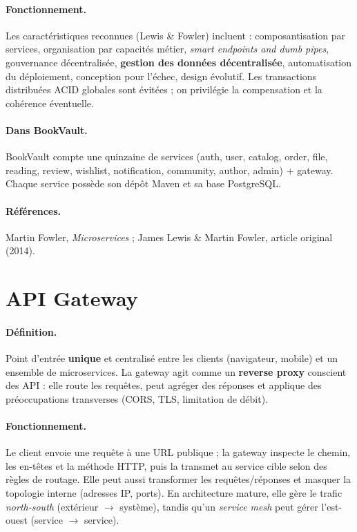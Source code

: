 \documentclass[12pt,a4paper]{report}
\begin{document}
\paragraph{Fonctionnement.} Les caractéristiques reconnues (Lewis \& Fowler) incluent : composantisation par services, organisation par capacités métier, \textit{smart endpoints and dumb pipes}, gouvernance décentralisée, \textbf{gestion des données décentralisée}, automatisation du déploiement, conception pour l'échec, design évolutif. Les transactions distribuées ACID globales sont évitées ; on privilégie la compensation et la cohérence éventuelle.\par

\paragraph{Dans BookVault.} BookVault compte une quinzaine de services (auth, user, catalog, order, file, reading, review, wishlist, notification, community, author, admin) + gateway. Chaque service possède son dépôt Maven et sa base PostgreSQL.\par

\paragraph{Références.} Martin Fowler, \textit{Microservices} ; James Lewis \& Martin Fowler, article original (2014).\par


\section{API Gateway}

\paragraph{Définition.} Point d'entrée \textbf{unique} et centralisé entre les clients (navigateur, mobile) et un ensemble de microservices. La gateway agit comme un \textbf{reverse proxy} conscient des API : elle route les requêtes, peut agréger des réponses et applique des préoccupations transverses (CORS, TLS, limitation de débit).\par

\paragraph{Fonctionnement.} Le client envoie une requête à une URL publique ; la gateway inspecte le chemin, les en-têtes et la méthode HTTP, puis la transmet au service cible selon des règles de routage. Elle peut aussi transformer les requêtes/réponses et masquer la topologie interne (adresses IP, ports). En architecture mature, elle gère le trafic \textit{north-south} (extérieur $\rightarrow$ système), tandis qu'un \textit{service mesh} peut gérer l'est-ouest (service $\rightarrow$ service).\par
\end{document}
